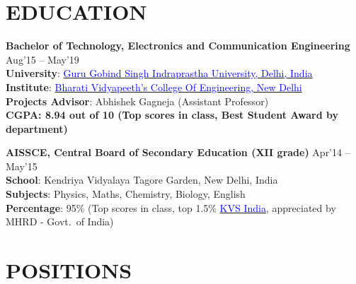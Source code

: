 \documentclass[11pt]{res} %
\newcommand{\titlegap}{5pt} %
\begin{document}
\begin{resume}

\vspace{-0.2cm}


\section{EDUCATION} %

\vspace{\titlegap}

{\bf Bachelor of Technology, Electronics and Communication Engineering} \hfill Aug'15 -- May'19 \\ 
\textbf{University}: \href{http://www.ipu.ac.in/}{\textcolor{blue}{Guru Gobind Singh Indraprastha University, Delhi, India}}\\
\textbf{Institute}: \href{http://bvcoend.ac.in}{\textcolor{blue}{Bharati Vidyapeeth's College Of Engineering, New Delhi}}\\
\textbf{Projects Advisor}: Abhishek Gagneja (Assistant Professor)\\
\textbf{CGPA: 8.94 out of 10 (Top scores in class, Best Student Award by department)}

{\bf AISSCE, Central Board of Secondary Education (XII grade)} \hfill Apr'14 -- May'15 \\ 
\textbf{School}: Kendriya Vidyalaya Tagore Garden, New Delhi, India\\
\textbf{Subjects}: Physics, Maths, Chemistry, Biology, English\\
\textbf{Percentage}: 95\% (Top scores in class, top 1.5\% \href{https://kvsangathan.nic.in/}{\textcolor{blue}{KVS India}}, appreciated by MHRD - Govt.\ of India)

\vspace{0.1in}
\hline




\section{POSITIONS}
\vspace{\titlegap}



\end{resume}
\end{document}
